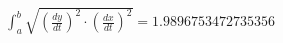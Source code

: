 \documentclass[preview]{standalone}
\begin{document}
\begin{align*}
\int_{a}^{b} \sqrt{\left(\frac{dy}{dt}\right)^2 \cdot \left(\frac{dx}{dt}\right)^2} = 1.9896753472735356
\end{align*}
\end{document}
